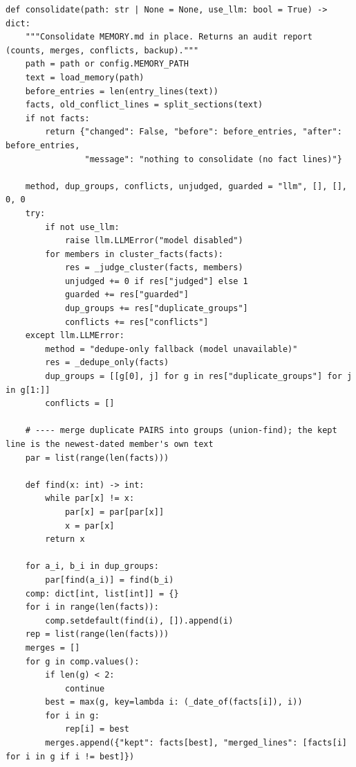 \documentclass[11pt]{article}
\begin{document}
\endgroup
\begingroup\lstset{basicstyle=\ttfamily\scriptsize}
\begin{lstlisting}
def consolidate(path: str | None = None, use_llm: bool = True) -> dict:
    """Consolidate MEMORY.md in place. Returns an audit report (counts, merges, conflicts, backup)."""
    path = path or config.MEMORY_PATH
    text = load_memory(path)
    before_entries = len(entry_lines(text))
    facts, old_conflict_lines = split_sections(text)
    if not facts:
        return {"changed": False, "before": before_entries, "after": before_entries,
                "message": "nothing to consolidate (no fact lines)"}

    method, dup_groups, conflicts, unjudged, guarded = "llm", [], [], 0, 0
    try:
        if not use_llm:
            raise llm.LLMError("model disabled")
        for members in cluster_facts(facts):
            res = _judge_cluster(facts, members)
            unjudged += 0 if res["judged"] else 1
            guarded += res["guarded"]
            dup_groups += res["duplicate_groups"]
            conflicts += res["conflicts"]
    except llm.LLMError:
        method = "dedupe-only fallback (model unavailable)"
        res = _dedupe_only(facts)
        dup_groups = [[g[0], j] for g in res["duplicate_groups"] for j in g[1:]]
        conflicts = []

    # ---- merge duplicate PAIRS into groups (union-find); the kept line is the newest-dated member's own text
    par = list(range(len(facts)))

    def find(x: int) -> int:
        while par[x] != x:
            par[x] = par[par[x]]
            x = par[x]
        return x

    for a_i, b_i in dup_groups:
        par[find(a_i)] = find(b_i)
    comp: dict[int, list[int]] = {}
    for i in range(len(facts)):
        comp.setdefault(find(i), []).append(i)
    rep = list(range(len(facts)))
    merges = []
    for g in comp.values():
        if len(g) < 2:
            continue
        best = max(g, key=lambda i: (_date_of(facts[i]), i))
        for i in g:
            rep[i] = best
        merges.append({"kept": facts[best], "merged_lines": [facts[i] for i in g if i != best]})


\end{lstlisting}
\end{document}
